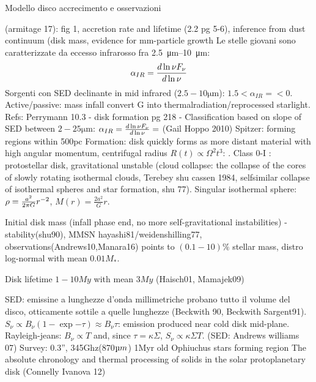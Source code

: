\begin{reworking}{Modello disco accrecimento e osservazioni}
	\begin{workout}
		(armitage 17): fig 1, accretion rate and lifetime (2.2 pg 5-6), inference from dust continuum (disk mass, evidence for mm-particle growth
		Le stelle giovani sono caratterizzate da eccesso infrarosso fra \SIrange{2.5}{10}{\micro\meter}:
		\begin{equation}
		\alpha_{IR}=\frac{d \ln{\nu F_{\nu}}}{d \ln{\nu}}
		\end{equation}
		Sorgenti con SED declinante in mid infrared ($2.5-10\si{\micro\meter}$): $1.5<\alpha_{IR}=<0$. Active/passive: mass infall convert G into thermalradiation/reprocessed starlight.
		Refs: Perrymann 10.3 - disk formation pg 218 - 
		Classification based on slope of SED between $2-25\si{\micro\meter}$: $\alpha_{IR}=\frac{d \ln{\nu F_{\nu}}}{d \ln{\nu}}=$ (Gail Hoppo 2010)
		Spitzer: forming regions within 500pc
		Formation: disk quickly forms as more distant material with high angular momentum, centrifugal radius $R(t)\propto\Omega^2 t^3$: . Class 0-I : protostellar disk, gravitational unstable (cloud collapse: the collapse of the cores of slowly rotating isothermal clouds, Terebey shu cassen 1984, selfsimilar collapse of isothermal spheres and star formation, shu 77). Singular isothermal sphere: $\rho=\frac{a^2}{2\pi G}r^{-2}$, $M(r)=\frac{2a^2}{G}r$.
	\end{workout}
	
	\begin{workout}
		
		Initial disk mass
		(infall phase end, no more self-gravitational instabilities) - stability(shu90), MMSN hayashi81/weidenshilling77, observations(Andrews10,Manara16) points to $(0.1-10)\%$ stellar mass, distro log-normal with mean $0.01M_*$.
		
		{Disk lifetime}
		$1-10My$ with mean $3My$ (Haisch01, Mamajek09)
		
	\end{workout}
	
	\begin{workout}
		SED: emissine a lunghezze d'onda millimetriche probano tutto il volume del disco, otticamente sottile a quelle lunghezze (Beckwith 90, Beckwith Sargent91).
		$S_{\nu}\propto B_{\nu}(1-\exp{-\tau})\approx B_{\nu}\tau$: emission produced near cold disk mid-plane.
		Rayleigh-jeans: $B_{\nu}\propto T$ and, since $\tau=\kappa\Sigma$, $S_{\nu}\propto \kappa\Sigma T$.
		(SED: Andrews williams 07)
		Survey: 0.3'', 345Ghz(870$\micro m$) 1Myr old Ophiuchus stars forming region
		The absolute chronology and thermal processing of solids in the solar protoplanetary disk (Connelly Ivanova 12)
	\end{workout}
	

\end{reworking}
